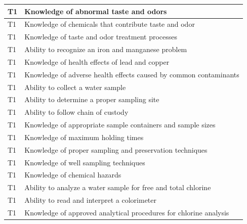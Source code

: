 \begin{table}[H]
\begin{tabular}{| m{1cm} |m{15cm} |}
T1 & Knowledge of abnormal   taste and odors                                                           \\ \hline
T1 & Knowledge of   chemicals that contribute taste and odor                                           \\ \hline
T1 & Knowledge of taste   and odor treatment processes                                                 \\ \hline
T1 & Ability to recognize   an iron and manganese problem                                              \\ \hline
T1 & Knowledge of health   effects of lead and copper                                                  \\ \hline
T1 & Knowledge of adverse   health effects caused by common contaminants                               \\ \hline
T1 & Ability to collect a   water sample                                                               \\ \hline
T1 & Ability to determine   a proper sampling site                                                     \\ \hline
T1 & Ability to follow   chain of custody                                                              \\ \hline
T1 & Knowledge of   appropriate sample containers and sample sizes                                     \\ \hline
T1 & Knowledge of maximum   holding times                                                              \\ \hline
T1 & Knowledge of proper   sampling and preservation techniques                                        \\ \hline
T1 & Knowledge of well   sampling techniques                                                           \\ \hline
T1 & Knowledge of chemical   hazards                                                                   \\ \hline
T1 & Ability to analyze a   water sample for free and total chlorine                                   \\ \hline
T1 & Ability to read and   interpret a colorimeter                                                     \\ \hline
T1 & Knowledge of approved   analytical procedures for chlorine analysis                               \\ \hline

\end{tabular}
\end{table}
